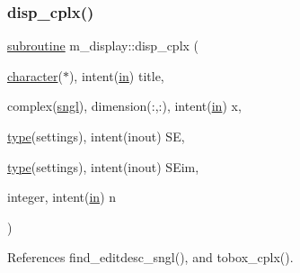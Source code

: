 \subsubsection{\texorpdfstring{disp\+\_\+cplx()}{disp\_cplx()}}
{\footnotesize\ttfamily \hyperlink{M__stopwatch_83_8txt_acfbcff50169d691ff02d4a123ed70482}{subroutine} m\+\_\+display\+::disp\+\_\+cplx (\begin{DoxyParamCaption}\item[{\hyperlink{option__stopwatch_83_8txt_abd4b21fbbd175834027b5224bfe97e66}{character}($\ast$), intent(\hyperlink{M__journal_83_8txt_afce72651d1eed785a2132bee863b2f38}{in})}]{title,  }\item[{complex(\hyperlink{namespacem__display_a2ac86bc535c3ccc5947dbb3109c666b5}{sngl}), dimension(\+:,\+:), intent(\hyperlink{M__journal_83_8txt_afce72651d1eed785a2132bee863b2f38}{in})}]{x,  }\item[{\hyperlink{stop__watch_83_8txt_a70f0ead91c32e25323c03265aa302c1c}{type}(settings), intent(inout)}]{SE,  }\item[{\hyperlink{stop__watch_83_8txt_a70f0ead91c32e25323c03265aa302c1c}{type}(settings), intent(inout)}]{S\+Eim,  }\item[{integer, intent(\hyperlink{M__journal_83_8txt_afce72651d1eed785a2132bee863b2f38}{in})}]{n }\end{DoxyParamCaption})\hspace{0.3cm}{\ttfamily [private]}}



References find\+\_\+editdesc\+\_\+sngl(), and tobox\+\_\+cplx().

